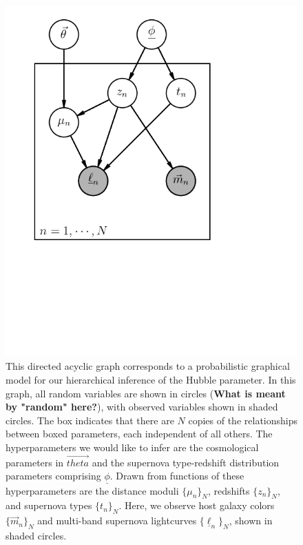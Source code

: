 \documentclass[12pt, onecolumn]{emulateapj}
\newcommand{\textul}{\underline}
\begin{document}
\vspace{1in}
\begin{figure}
\begin{center}
\includegraphics{Hubble-draft.png}
\caption{This directed acyclic graph corresponds to a probabilistic graphical model for our hierarchical inference of the Hubble parameter.  In this graph, all random variables are shown in circles ({\bf What is meant by "random" here?}), with observed variables shown in shaded circles.  The box indicates that there are $N$ copies of the relationships between boxed parameters, each independent of all others.  The hyperparameters we would like to infer are the cosmological parameters in $\vec{theta}$ and the supernova type-redshift distribution parameters comprising $\textul{\phi}$.  Drawn from functions of these hyperparameters are the distance moduli $\{\mu_{n}\}_{N}$, redshifts $\{z_{n}\}_{N}$, and supernova types $\{t_{n}\}_{N}$.  Here, we observe host galaxy colors $\{\vec{m}_{n}\}_{N}$ and multi-band supernova lightcurves $\{\textul{\ell}_{n}\}_{N}$, shown in shaded circles.}
\label{fig:pgm}
\end{center}
\end{figure}
\vspace{1in}
\end{document}
